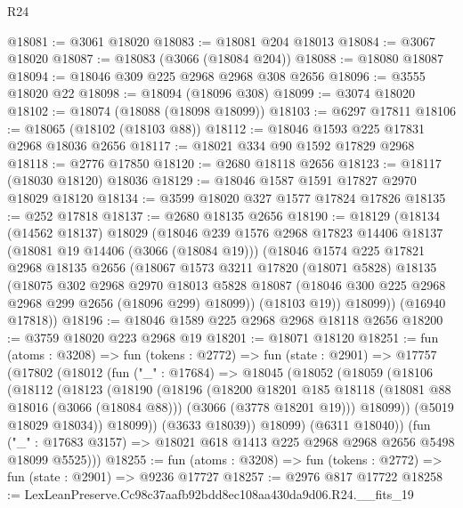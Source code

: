 \begin{lexlean}{R24}
\begin{coremodule}
@18081 := @3061 @18020
@18083 := @18081 @204 @18013
@18084 := @3067 @18020
@18087 := @18083 (@3066 (@18084 @204))
@18088 := @18080 @18087
@18094 := @18046 @309 @225 @2968 @2968 @308 @2656
@18096 := @3555 @18020 @22
@18098 := @18094 (@18096 @308)
@18099 := @3074 @18020
@18102 := @18074 (@18088 (@18098 @18099))
@18103 := @6297 @17811
@18106 := @18065 (@18102 (@18103 @88))
@18112 := @18046 @1593 @225 @17831 @2968 @18036 @2656
@18117 := @18021 @334 @90 @1592 @17829 @2968
@18118 := @2776 @17850
@18120 := @2680 @18118 @2656
@18123 := @18117 (@18030 @18120) @18036
@18129 := @18046 @1587 @1591 @17827 @2970 @18029 @18120
@18134 := @3599 @18020 @327 @1577 @17824 @17826
@18135 := @252 @17818
@18137 := @2680 @18135 @2656
@18190 := @18129
    (@18134
      (@14562 @18137)
      @18029
      (@18046
        @239
        @1576
        @2968
        @17823
        @14406
        @18137
        (@18081 @19 @14406 (@3066 (@18084 @19)))
        (@18046
          @1574
          @225
          @17821
          @2968
          @18135
          @2656
          (@18067
            @1573
            @3211
            @17820
            (@18071 @5828)
            @18135
            (@18075
              @302
              @2968
              @2970
              @18013
              @5828
              @18087
              (@18046 @300 @225 @2968 @2968 @299 @2656 (@18096 @299) @18099))
            (@18103 @19))
          @18099))
      (@16940 @17818))
@18196 := @18046 @1589 @225 @2968 @2968 @18118 @2656
@18200 := @3759 @18020 @223 @2968 @19
@18201 := @18071 @18120
@18251 := fun (atoms : @3208) =>
  fun (tokens : @2772) =>
  fun (state : @2901) =>
  @17757
    (@17802
      (@18012
        (fun ("_" : @17684) =>
        @18045
          (@18052
            (@18059
              (@18106
                (@18112
                  (@18123
                    (@18190
                      (@18196
                        (@18200
                          @18201
                          @185
                          @18118
                          (@18081 @88 @18016 (@3066 (@18084 @88)))
                          (@3066 (@3778 @18201 @19)))
                        @18099))
                    (@5019 @18029 @18034))
                  @18099))
              (@3633 @18039))
            @18099)
          (@6311 @18040))
        (fun ("_" : @17683 @3157) => @18021 @618 @1413 @225 @2968 @2968 @2656 @5498 @18099 @5525)))
@18255 := fun (atoms : @3208) => fun (tokens : @2772) => fun (state : @2901) => @9236 @17727
@18257 := @2976 @817 @17722
@18258 := LexLeanPreserve.Cc98c37aafb92bdd8ec108aa430da9d06.R24.__fits_19

\end{coremodule}
\end{lexlean}

